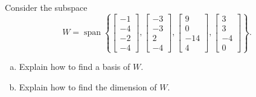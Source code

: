 
\begin{exerciseStatement}


Consider the subspace \[W=\operatorname{span}  \left\{ \left[\begin{array}{c}
-1 \\
-4 \\
-2 \\
-4
\end{array}\right] , \left[\begin{array}{c}
-3 \\
-3 \\
2 \\
-4
\end{array}\right] , \left[\begin{array}{c}
9 \\
0 \\
-14 \\
4
\end{array}\right] , \left[\begin{array}{c}
3 \\
3 \\
-4 \\
0
\end{array}\right] \right\} .\]


\begin{enumerate}[(a)]
\item  Explain how to find a basis of \(W\).
\item  Explain how to find the dimension of \(W\).
\end{enumerate}
    
\end{exerciseStatement}
    

